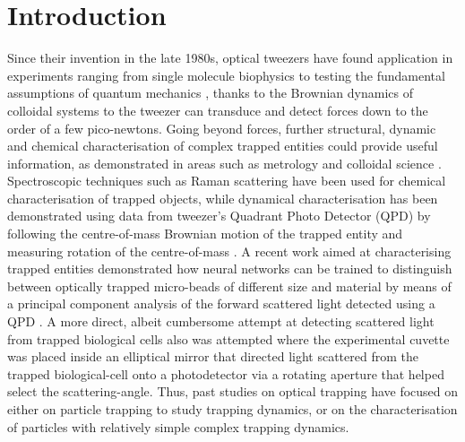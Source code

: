 \documentclass[preprint,  3p]{elsarticle}
\begin{document}
\section{Introduction}
\label{sec:Intro}
Since their invention in the late 1980s, optical tweezers have found application in experiments ranging from single molecule biophysics \cite{Bustamante2021Biophysics} to testing the fundamental assumptions of quantum mechanics \cite{yin2013large}, thanks to the Brownian dynamics of colloidal systems to the tweezer can transduce and detect forces down to the order of a few pico-newtons. Going beyond forces, further structural, dynamic and chemical characterisation of complex trapped entities could provide useful information, as demonstrated in areas such as metrology \cite{arita2020coherent} and colloidal science \cite{burns1990optical}. Spectroscopic techniques such as Raman scattering \cite{gupta2014raman} have been used for chemical characterisation of trapped objects, while dynamical characterisation has been demonstrated using data from tweezer's Quadrant Photo Detector (QPD) by following the centre-of-mass Brownian motion of the trapped entity \cite{friedrich2012tuning} and measuring rotation of the centre-of-mass \cite{yifat2021facile}. A recent work aimed at characterising trapped entities demonstrated how neural networks can be trained to distinguish between optically trapped micro-beads of different size and material by means of a principal component analysis of the forward scattered light detected using a QPD \cite{Carvalho_2023}. A more direct, albeit cumbersome attempt at detecting scattered light from trapped biological cells also was attempted \cite{Watson_2023} where the experimental cuvette was placed inside an elliptical mirror that directed light scattered from the trapped biological-cell onto a photodetector via a rotating aperture that helped select the scattering-angle. Thus, past studies on optical trapping have focused on either on particle trapping to study trapping dynamics, or on the characterisation of particles with relatively simple complex trapping dynamics. 
\end{document}
